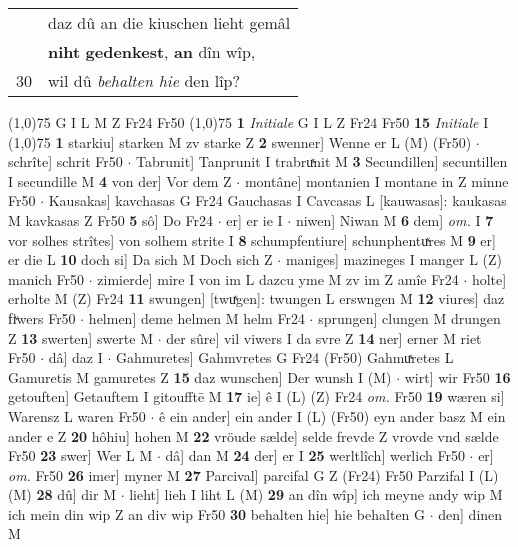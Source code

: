 \documentclass[8pt,a4paper,notitlepage]{article}
\begin{document}
\begin{table}[ht]
\begin{minipage}[t]{0.5\linewidth}
\begin{tabular}{rl}
 & daz dû an die kiuschen lieht gemâl\\ 
 & \textbf{niht} \textbf{gedenkest}, \textbf{an} dîn wîp,\\ 
30 & wil dû \textit{behalten hie} den lîp?\\ 
\end{tabular}
\scriptsize
\line(1,0){75} \newline
G I L M Z Fr24 Fr50 \newline
\line(1,0){75} \newline
\textbf{1} \textit{Initiale} G I L Z Fr24 Fr50  \textbf{15} \textit{Initiale} I  \newline
\line(1,0){75} \newline
\textbf{1} starkiu] starken M zv starke Z \textbf{2} swenner] Wenne er L (M) (Fr50)  $\cdot$ schrîte] schrit Fr50  $\cdot$ Tabrunit] Tanprunit I trabruͯnit M \textbf{3} Secundillen] secuntillen I secundille M \textbf{4} von der] Vor dem Z  $\cdot$ montâne] montanien I montane in Z minne Fr50  $\cdot$ Kausakas] kavchasas G Fr24 Gauchasas I Cavcasas L [kauwasas]: kaukasas M kavkasas Z Fr50 \textbf{5} sô] Do Fr24  $\cdot$ er] er ie I  $\cdot$ niwen] Niwan M \textbf{6} dem] \textit{om.} I \textbf{7} vor solhes strîtes] von solhem strite I \textbf{8} schumpfentiure] schunphentuͯres M \textbf{9} er] er die L \textbf{10} doch si] Da sich M Doch sich Z  $\cdot$ maniges] mazineges I manger L (Z) manich Fr50  $\cdot$ zimierde] mire I von im L dazcu yme M zv im Z amîe Fr24  $\cdot$ holte] erholte M (Z) Fr24 \textbf{11} swungen] [twuͯgen]: twungen L erswngen M \textbf{12} viures] daz fiͮwers Fr50  $\cdot$ helmen] deme helmen M helm Fr24  $\cdot$ sprungen] clungen M drungen Z \textbf{13} swerten] swerte M  $\cdot$ der sûre] vil viwers I da svre Z \textbf{14} ner] erner M riet Fr50  $\cdot$ dâ] daz I  $\cdot$ Gahmuretes] Gahmvretes G Fr24 (Fr50) Gahmuͯretes L Gamuretis M gamuretes Z \textbf{15} daz wunschen] Der wunsh I (M)  $\cdot$ wirt] wir Fr50 \textbf{16} getouften] Getauftem I gitoufftē M \textbf{17} ie] ê I (L) (Z) Fr24 \textit{om.} Fr50 \textbf{19} wæren si] Warensz L waren Fr50  $\cdot$ ê ein ander] ein ander I (L) (Fr50) eyn ander basz M ein ander e Z \textbf{20} hôhiu] hohen M \textbf{22} vröude sælde] selde frevde Z vrovde vnd sælde Fr50 \textbf{23} swer] Wer L M  $\cdot$ dâ] dan M \textbf{24} der] er I \textbf{25} werltlîch] werlich Fr50  $\cdot$ er] \textit{om.} Fr50 \textbf{26} imer] myner M \textbf{27} Parcival] parcifal G Z (Fr24) Fr50 Parzifal I (L) (M) \textbf{28} dû] dir M  $\cdot$ lieht] lieh I liht L (M) \textbf{29} an dîn wîp] ich meyne andy wip M ich mein din wip Z an div wip Fr50 \textbf{30} behalten hie] hie behalten G  $\cdot$ den] dinen M \newline

\end{minipage}
\end{table}
\end{document}
